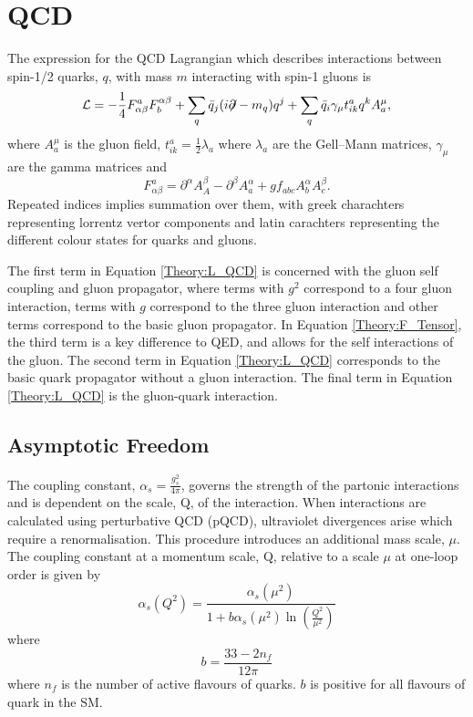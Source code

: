 \section{QCD}
\label{Theory:QCD}

The expression for the QCD Lagrangian which describes interactions between spin-1/2 quarks, $q$, with mass $m$ interacting with spin-1 gluons is 
\begin{equation}
\mathcal{L} = - \frac{1}{4} F^{a}_{\alpha\beta} F_{b}^{\alpha\beta} + \sum_{q} \bar{q}_{j}( i{\not}\partial - m_{q})q^{j}  + \sum_{q} \bar{q}_{i}\gamma_{\mu} t^{a}_{ik} q^{k} A^{\mu}_{a}, 
\label{Theory:L_QCD}
\end{equation}
where $A^{\mu}_{a}$ is the gluon field, $t^{a}_{ik}=\frac{1}{2}\lambda_{a}$ where $\lambda_{a}$ are the Gell--Mann matrices, $\gamma_{\mu}$ are the gamma matrices and 
\begin{equation}
F^{a}_{\alpha\beta} = \partial^{\alpha}A_{A}^{\beta} - \partial^{\beta}A_{a}^{\alpha} + g f_{abc} A_{b}^{\alpha}A_{c}^{\beta}. 
\label{Theory:F_Tensor}
\end{equation}
Repeated indices implies summation over them, with greek charachters representing lorrentz vertor components and latin carachters representing the different colour states for quarks and gluons. 

The first term in Equation \ref{Theory:L_QCD} is concerned with the gluon self coupling and gluon propagator, where terms with $g^2$  correspond to a four gluon interaction, terms with $g$ correspond to the three gluon interaction and other terms correspond to the basic gluon propagator.
In Equation \ref{Theory:F_Tensor}, the third term is a key difference to QED, and allows for the self interactions of the gluon.
The second term in Equation \ref{Theory:L_QCD} corresponds to the basic quark propagator without a gluon interaction.
The final term in Equation \ref{Theory:L_QCD} is the gluon-quark interaction.

\subsection{Asymptotic Freedom}


The coupling constant, $\alpha_{s} = \frac{g_s^2}{4\pi}$, governs the strength of the partonic interactions and is dependent on the scale, Q, of the interaction.
When interactions are calculated using perturbative QCD (pQCD), ultraviolet divergences arise which require a renormalisation. 
This procedure introduces an additional mass scale, $\mu$.
The coupling constant at a momentum scale, Q, relative to a scale $\mu$ at one-loop order is given by
\begin{equation}
\alpha_{s}(Q^2) = \frac{\alpha_{s}(\mu^2)}{1+b\alpha_{s}(\mu^2)\ln(\frac{Q^2}{\mu^2})}
\label{Theory:Coupling}
\end{equation}
where 
\begin{equation}
b = \frac{33-2n_f}{12\pi}
\label{Theory:b_Coupling}
\end{equation}
where $n_f$ is the number of active flavours of quarks.
$b$ is positive for all flavours of quark in the SM.

